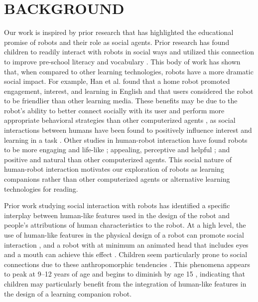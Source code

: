 \documentclass{sigchi}
\begin{document}
\section{BACKGROUND}
Our work is inspired by prior research that has highlighted the educational promise of robots and their role as social agents. {\color{Purple}Prior research has found children to readily interact with robots in social ways and utilized this connection to improve pre-school literacy \cite{Kory:2014} and vocabulary \cite{Spaulding:2016}. This body of work has shown that, when compared to other learning technologies, robots have a more dramatic social impact. For example, Han et al. \cite{Han:2005} found that a home robot promoted engagement, interest, and learning in English and that users considered the robot to be friendlier than other learning media.} These benefits may be due to the robot's ability to better connect socially with its user and perform more appropriate behavioral strategies than other computerized agents \cite{Brown:2013}, as social interactions between humans have been found to positively influence interest and learning in a task \cite{Sansone:2005}. Other studies in human-robot interaction have found robots to be more engaging and life-like \cite{Kiesler:2008}; appealing, perceptive and helpful \cite{Wainer:2007}; and positive and natural \cite{Bainbridge:2011} than other computerized agents. This social nature of human-robot interaction motivates our exploration of robots as learning companions rather than other computerized agents or alternative learning technologies for reading. 

Prior work studying social interaction with robots has identified a specific interplay between human-like features used in the design of the robot and people's attributions of human characteristics to the robot. At a high level, the use of human-like features in the physical design of a robot can promote social interaction \cite{Duffy:2003}, and a robot with at minimum an animated head that includes eyes and a mouth can achieve this effect \cite{Martini:2015}. Children seem particularly prone to social connections due to these anthropomorphic tendencies \cite{Tung:2016}. This phenomena appears to peak at 9--12 years of age and begins to diminish by age 15 \cite{Kahn:2012}, indicating that children may particularly benefit from the integration of human-like features in the design of a learning companion robot.
\end{document}
